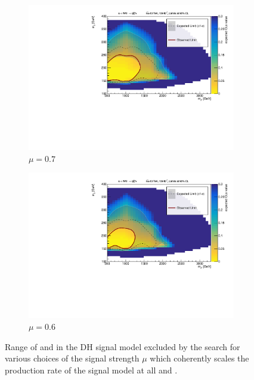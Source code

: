 \begin{figure}[h]
\begin{subfigure}{0.48\textwidth}
    \includegraphics[width=\textwidth]{Figures/App_signal_strength/unblinded_mu0_7_nosig.pdf}
    \caption{\(\mu=0.7\)}\label{fig:unblinded_0.7}
  \end{subfigure} \hspace{0.3em}
  \begin{subfigure}{0.48\textwidth}
    \includegraphics[width=\textwidth]{Figures/App_signal_strength/unblinded_mu0_6_nosig.pdf}
    \caption{\(\mu=0.6\)}\label{fig:unblinded_0.6}
  \end{subfigure}
  \caption[]{Range of \ms and \mZp in the DH signal model excluded by the search for various choices of the signal strength \(\mu\) which coherently scales the production rate of the signal model at all \ms and \mZp.}
  \label{fig:limits_vary_mu_sig}
\end{figure}
